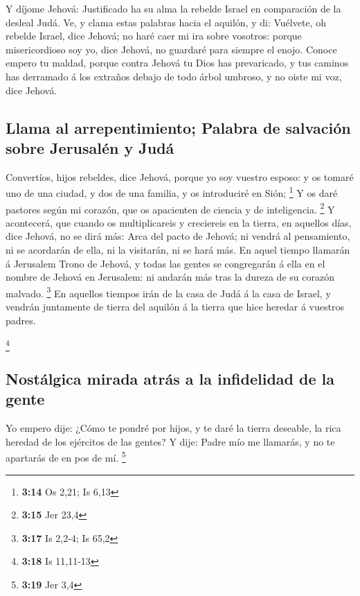  Y díjome Jehová: Justificado ha su alma la rebelde
Israel en comparación de la desleal Judá.  Ve, y clama
estas palabras hacia el aquilón, y di: Vuélvete, oh rebelde Israel, dice
Jehová; no haré caer mi ira sobre vosotros: porque misericordioso soy
yo, dice Jehová, no guardaré para siempre el enojo. 
Conoce empero tu maldad, porque contra Jehová tu Dios has prevaricado, y
tus caminos has derramado á los extraños debajo de todo árbol umbroso, y
no oiste mi voz, dice Jehová.

\hypertarget{llama-al-arrepentimiento-palabra-de-salvaciuxf3n-sobre-jerusaluxe9n-y-juduxe1}{%
\subsection{Llama al arrepentimiento; Palabra de salvación sobre
Jerusalén y
Judá}\label{llama-al-arrepentimiento-palabra-de-salvaciuxf3n-sobre-jerusaluxe9n-y-juduxe1}}

 Convertíos, hijos rebeldes, dice Jehová, porque yo soy
vuestro esposo: y os tomaré uno de una ciudad, y dos de una familia, y
os introduciré en Sión; \footnote{\textbf{3:14} Os 2,21; Is 6,13}
 Y os daré pastores según mi corazón, que os apacienten
de ciencia y de inteligencia. \footnote{\textbf{3:15} Jer 23,4}
 Y acontecerá, que cuando os multiplicareis y creciereis
en la tierra, en aquellos días, dice Jehová, no se dirá más: Arca del
pacto de Jehová; ni vendrá al pensamiento, ni se acordarán de ella, ni
la visitarán, ni se hará más.  En aquel tiempo llamarán á
Jerusalem Trono de Jehová, y todas las gentes se congregarán á ella en
el nombre de Jehová en Jerusalem: ni andarán más tras la dureza de su
corazón malvado. \footnote{\textbf{3:17} Is 2,2-4; Is 65,2}
 En aquellos tiempos irán de la casa de Judá á la casa de
Israel, y vendrán juntamente de tierra del aquilón á la tierra que hice
heredar á vuestros padres.

\footnote{\textbf{3:18} Is 11,11-13}

\hypertarget{nostuxe1lgica-mirada-atruxe1s-a-la-infidelidad-de-la-gente}{%
\subsection{Nostálgica mirada atrás a la infidelidad de la
gente}\label{nostuxe1lgica-mirada-atruxe1s-a-la-infidelidad-de-la-gente}}

 Yo empero dije: ¿Cómo te pondré por hijos, y te daré la
tierra deseable, la rica heredad de los ejércitos de las gentes? Y dije:
Padre mío me llamarás, y no te apartarás de en pos de mí. \footnote{\textbf{3:19}
  Jer 3,4}

